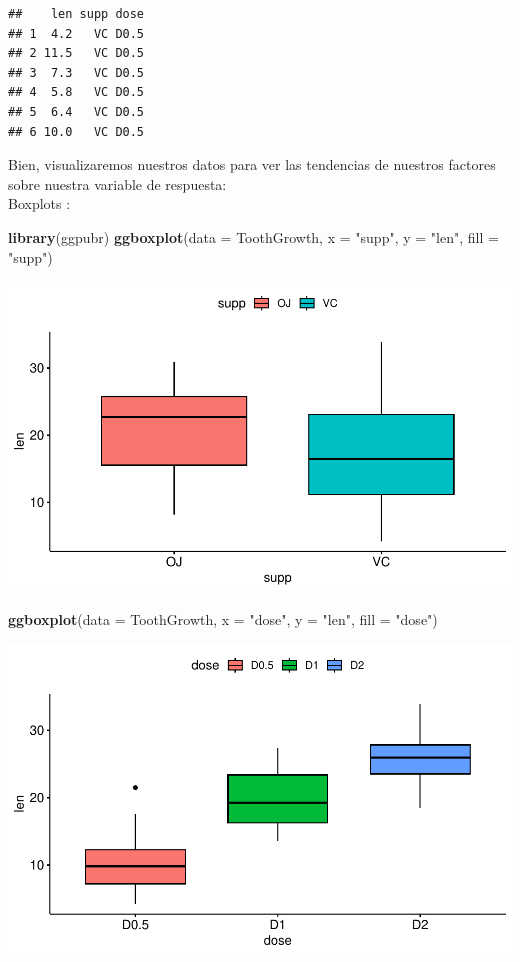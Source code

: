 \documentclass[
]{book}
\newenvironment{Shaded}{\begin{snugshade}}{\end{snugshade}}
\newcommand{\AttributeTok}[1]{\textcolor[rgb]{0.13,0.29,0.53}{#1}}
\newcommand{\FunctionTok}[1]{\textcolor[rgb]{0.13,0.29,0.53}{\textbf{#1}}}
\newcommand{\NormalTok}[1]{#1}
\newcommand{\StringTok}[1]{\textcolor[rgb]{0.31,0.60,0.02}{#1}}
\begin{document}
\begin{verbatim}
##    len supp dose
## 1  4.2   VC D0.5
## 2 11.5   VC D0.5
## 3  7.3   VC D0.5
## 4  5.8   VC D0.5
## 5  6.4   VC D0.5
## 6 10.0   VC D0.5
\end{verbatim}

\hfill\break
Bien, visualizaremos nuestros datos para ver las tendencias de nuestros factores sobre nuestra variable de respuesta:\\
Boxplots
:

\begin{Shaded}
\begin{Highlighting}[]
\FunctionTok{library}\NormalTok{(ggpubr)}
\FunctionTok{ggboxplot}\NormalTok{(}\AttributeTok{data =}\NormalTok{ ToothGrowth, }\AttributeTok{x =} \StringTok{"supp"}\NormalTok{, }\AttributeTok{y =} \StringTok{"len"}\NormalTok{, }\AttributeTok{fill =} \StringTok{"supp"}\NormalTok{)}
\end{Highlighting}
\end{Shaded}

\includegraphics{_main_files/figure-latex/unnamed-chunk-262-1.pdf}

\begin{Shaded}
\begin{Highlighting}[]
\FunctionTok{ggboxplot}\NormalTok{(}\AttributeTok{data =}\NormalTok{ ToothGrowth, }\AttributeTok{x =} \StringTok{"dose"}\NormalTok{, }\AttributeTok{y =} \StringTok{"len"}\NormalTok{, }\AttributeTok{fill =} \StringTok{"dose"}\NormalTok{)}
\end{Highlighting}
\end{Shaded}

\includegraphics{_main_files/figure-latex/unnamed-chunk-262-2.pdf}
\end{document}
